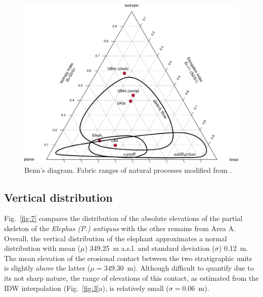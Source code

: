 \documentclass[review,authoryear,times]{elsarticle} %
\begin{document}
\begin{figure}[]
  \centering
  \includegraphics[width=1\textwidth]{../artwork/Fig6_.pdf}
  \caption{Benn's diagram. Fabric ranges of natural processes modified from \cite{Bertran1997,Lenoble2004}.}
  \label{fig:6}
\end{figure}

\subsection{Vertical distribution}



Fig.~\ref{fig:7} compares the distribution of the absolute elevations of the partial skeleton of the \emph{Elephas (P.) antiquus} with the other remains from Area A. Overall, the vertical distribution of the elephant approximates a normal distribution with mean ($\mu$) 349.25~m a.s.l. and standard deviation ($\sigma$) 0.12~m. The mean elevation of the erosional contact between the two stratigraphic units is slightly above the latter ($\mu=349.30$~m). Although difficult to quantify due to its not sharp nature, the range of elevations of this contact, as estimated from the IDW interpolation (Fig.~\ref{fig:3}a), is relatively small ($\sigma=0.06$~m).
\end{document}
